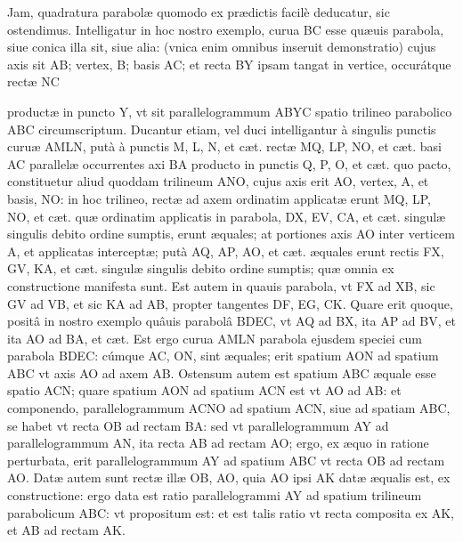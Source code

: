 \documentclass[11pt,a4paper]{article}
\begin{document}
Jam, quadratura parabolæ quomodo ex prædictis facilè deducatur, sic ostendimus. Intelligatur in hoc nostro exemplo, curua BC esse quæuis parabola, siue conica illa sit, siue alia: (vnica enim omnibus inseruit demonstratio) cujus axis sit AB; vertex, B; basis AC; et recta BY ipsam tangat in vertice, occurátque rectæ NC


productæ in puncto Y, vt sit parallelogrammum ABYC spatio trilineo parabolico ABC circumscriptum. Ducantur etiam, vel duci intelligantur à singulis punctis curuæ AMLN, putà à punctis M, L, N, et cæt. rectæ MQ, LP, NO, et cæt. basi AC parallelæ occurrentes axi BA producto in punctis Q, P, O, et cæt. quo pacto, constituetur aliud quoddam trilineum ANO, cujus axis erit AO, vertex, A, et basis, NO: in hoc trilineo, rectæ ad axem ordinatim applicatæ erunt MQ, LP, NO, et cæt. quæ ordinatim applicatis in parabola, DX, EV, CA, et cæt. singulæ singulis debito ordine sumptis, erunt æquales; at portiones axis AO inter verticem A, et applicatas interceptæ; putà AQ, AP, AO, et cæt. æquales erunt rectis FX, GV, KA, et cæt. singulæ singulis debito ordine sumptis; quæ omnia ex constructione manifesta sunt. Est autem in quauis parabola, vt FX ad XB, sic GV ad VB, et sic KA ad AB, propter tangentes DF, EG, CK. Quare erit quoque, positâ in nostro exemplo quâuis parabolâ BDEC, vt AQ ad BX, ita AP ad BV, et ita AO ad BA, et cæt. Est ergo curua AMLN parabola ejusdem speciei cum parabola BDEC: cúmque AC, ON, sint æquales; erit spatium AON ad spatium ABC vt axis AO ad axem AB. Ostensum autem est spatium ABC æquale esse spatio ACN; quare spatium AON ad spatium ACN est vt AO ad AB: et componendo, parallelogrammum ACNO ad spatium ACN, siue ad spatiam ABC, se habet vt recta OB ad rectam BA: sed vt parallelogrammum AY ad parallelogrammum AN, ita recta AB ad rectam AO; ergo, ex æquo in ratione perturbata, erit parallelogrammum AY ad spatium ABC vt recta OB ad rectam AO. Datæ autem sunt rectæ illæ OB, AO, quia AO ipsi AK datæ æqualis est, ex constructione: ergo data est ratio parallelogrammi AY ad spatium trilineum parabolicum ABC: vt propositum est: et est talis ratio vt recta composita ex AK, et AB ad rectam AK.
\end{document}
